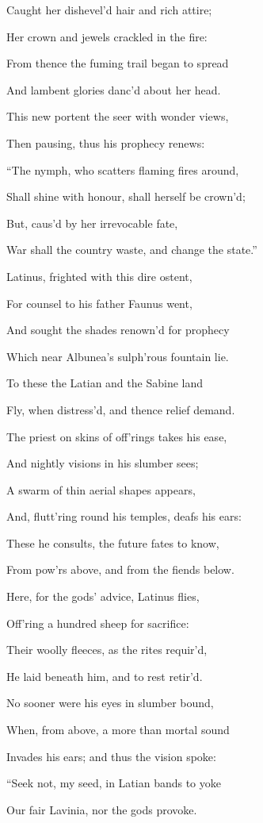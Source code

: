 Caught her dishevel’d hair and rich attire;

Her crown and jewels crackled in the fire:

From thence the fuming trail began to spread

And lambent glories danc’d about her head.

This new portent the seer with wonder views,

Then pausing, thus his prophecy renews:

“The nymph, who scatters flaming fires around,

Shall shine with honour, shall herself be crown’d;

But, caus’d by her irrevocable fate,

War shall the country waste, and change the state.”

Latinus, frighted with this dire ostent,

For counsel to his father Faunus went,

And sought the shades renown’d for prophecy

Which near Albunea’s sulph’rous fountain lie.

To these the Latian and the Sabine land

Fly, when distress’d, and thence relief demand.

The priest on skins of off’rings takes his ease,

And nightly visions in his slumber sees;

A swarm of thin aerial shapes appears,

And, flutt’ring round his temples, deafs his ears:

These he consults, the future fates to know,

From pow’rs above, and from the fiends below.

Here, for the gods’ advice, Latinus flies,

Off’ring a hundred sheep for sacrifice:

Their woolly fleeces, as the rites requir’d,

He laid beneath him, and to rest retir’d.

No sooner were his eyes in slumber bound,

When, from above, a more than mortal sound

Invades his ears; and thus the vision spoke:

“Seek not, my seed, in Latian bands to yoke

Our fair Lavinia, nor the gods provoke.

